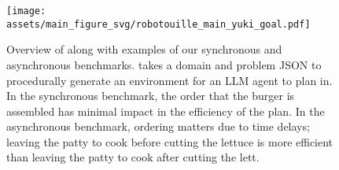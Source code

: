 \begin{figure}[!t]
    \centering
    \texttt{[image: assets/main\_figure\_svg/robotouille\_main\_yuki\_goal.pdf]}
    \caption{Overview of \robotouille{} along with examples of our synchronous and asynchronous benchmarks. \robotouille{} takes a domain and problem JSON to procedurally generate an environment for an LLM agent to plan in. In the synchronous benchmark, the order that the burger is assembled has minimal impact in the efficiency of the plan. In the asynchronous benchmark, ordering matters due to time delays; leaving the patty to cook before cutting the lettuce is more efficient than leaving the patty to cook after cutting the lett.}
    \label{fig:main}
\end{figure}
